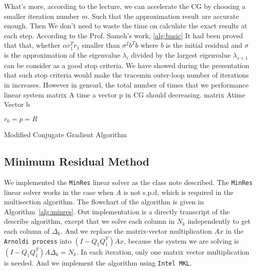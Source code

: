 What's more, according to the lecture, we can accelerate the CG by choosing a smaller iteration number $m$. Such that the approximation result are accurate enough. Then We don't need to waste the time on calculate the exact results at each step.  According to the Prof. Sameh's work, \ref{alg:basic} It had been proved that that, whether $\alpha r_1^Tr_1$ smaller than $\sigma^2b^Tb$ where $b$ is the initial residual and $\sigma$ is the approximation of the eigenvalue $\lambda_i$ divided by the largest eigenvalue $\lambda_{s+1} $ can be consider as a good stop criteria. We have showed during the presentation that such stop criteria would make the tracemin outer-loop number of iterations in increases. However in genearl, the total number of times that we performance linear system matrix A time a vector p in CG should decreasing.
matrix Atime Vector b \\
  
\begin{algorithm}[h]
	\SetArgSty{}
	{$r_0 = p = R$\;}
	\caption{Modified Conjugate Gradient Algorithm}
	\label{alg:modifiedcg}
\end{algorithm}


\subsection{Minimum Residual Method}
We implemented the {\tt MinRes} linear solver as the class note described. The {\tt MinRes} linear solver works in the case when $A$ is not s.p.d, which is required in the multisection algorithm.  The flowchart of the algorithm is given in Algorithm~\ref{alg:minres}. Out implementation is a directly transcript of the describe algorithm, except that we solve each column in $N_k$ independently to get each column of $\Delta_k$. And we replace the matrix-vector multiplication $Ax$ in the {\tt Arnoldi process} into $\left(I-Q_1 Q_1^T\right)Ax$, because the system we are solving is $\left(I-Q_1 Q_1^T\right)A \Delta_k = N_k$. In each iteration, only one matrix vector multiplication is needed. And we implement the algorithm using {\tt Intel MKL}.

